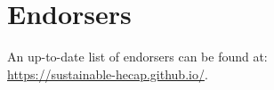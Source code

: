\documentclass[../SustainableHEP.tex]{subfiles}
\begin{document}
\newpage


\section*{Endorsers}
{}

An up-to-date list of endorsers can be found at:\\ \url{https://sustainable-hecap.github.io/}.\\
\bigskip

\end{document}
